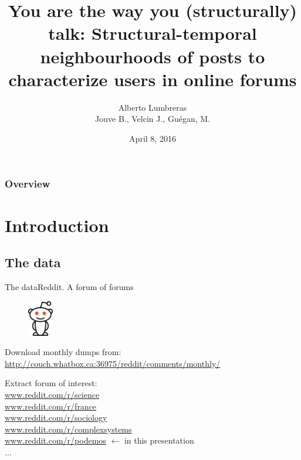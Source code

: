 \documentclass{beamer}
\begin{document}

	
\title{You are the way you (structurally) talk:  Structural-temporal neighbourhoods of posts to characterize users in online forums}
\author{Alberto Lumbreras \\Jouve B., Velcin J., Guégan, M.}
\date{April 8, 2016}
\maketitle

\begin{frame}\frametitle{Overview} 
\begin{NoHyper}
\tableofcontents
\end{NoHyper}
\end{frame}

\section{Introduction}
\subsection{The data}

\begin{frame}{The data}{Reddit. A forum of forums}
	\begin{figure}
		\centering
		\includegraphics[width=0.1\textwidth]{reddit-logo}	
	\end{figure}
	Download monthly dumps from:
	\href{http://couch.whatbox.ca:36975/reddit/comments/monthly/}{http://couch.whatbox.ca:36975/reddit/comments/monthly/}
	
	\vfill
	Extract forum of interest:\\
	\href{www.reddit.com/r/podemos}{www.reddit.com/r/{\color{red}science}}\\
	\href{www.reddit.com/r/podemos}{www.reddit.com/r/{\color{red}france}}\\
	\href{www.reddit.com/r/podemos}{www.reddit.com/r/{\color{red}sociology}}\\
	\href{www.reddit.com/r/podemos}{www.reddit.com/r/{\color{red}complexsystems}}\\
	\href{www.reddit.com/r/podemos}{www.reddit.com/r/{\color{red}podemos}} $\leftarrow$ in this presentation\\
	...
\end{frame}
\end{document}
